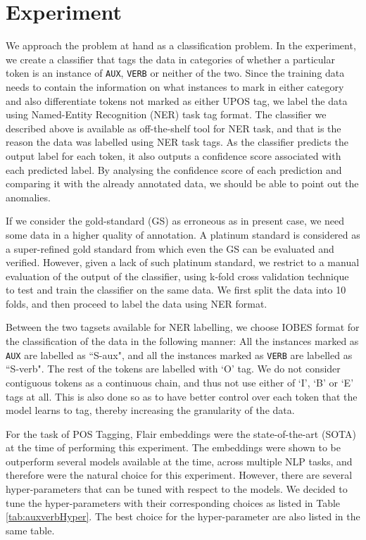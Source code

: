 \section{Experiment}
\label{ssec:auxverbExperiment}

We approach the problem at hand as a classification problem. In the experiment, we create a classifier that tags the data in categories of whether a particular token is an instance of \verb|AUX|, \verb|VERB| or neither of the two.  Since the training data needs to contain the information on what instances to mark in either category and also differentiate tokens not marked as either UPOS tag, we label the data using Named-Entity Recognition (NER) task tag format. The classifier we described above is available as off-the-shelf tool for NER task, and that is the reason the data was labelled using NER task tags. As the classifier predicts the output label for each token, it also outputs a confidence score associated with each predicted label. By analysing the confidence score of each prediction and comparing it with the already annotated data, we should be able to point out the anomalies.

If we consider the gold-standard (GS) as erroneous as in present case, we need some data in a higher quality of annotation. A platinum standard is considered as a super-refined gold standard from which even the GS can be evaluated and verified. However, given a lack of such platinum standard, we restrict to a manual evaluation of the output of the classifier, using k-fold cross validation technique to test and train the classifier on the same data. We first split the data into 10 folds, and then proceed to label the data using NER format.

Between the two tagsets available for NER labelling, we choose IOBES format for the classification of the data in the following manner: All the instances marked as \texttt{AUX} are labelled as ``S-aux", and all the instances marked as \texttt{VERB} are labelled as ``S-verb". The rest of the tokens are labelled with `O' tag. We do not consider contiguous tokens as a continuous chain, and thus not use either of `I', `B' or `E' tags at all. This is also done so as to have better control over each token that the model learns to tag, thereby increasing the granularity of the data.

For the task of POS Tagging, Flair embeddings \citep{flair} were the state-of-the-art (SOTA) at the time of performing this experiment. The embeddings were shown to be outperform several models available at the time, across multiple NLP tasks, and therefore were the natural choice for this experiment. However, there are several hyper-parameters that can be tuned with respect to the models. We decided to tune the hyper-parameters with their corresponding choices as listed in Table \ref{tab:auxverbHyper}. The best choice for the hyper-parameter are also listed in the same table. 

